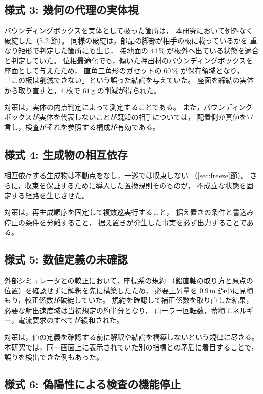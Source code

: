 \documentclass[a4paper,10pt,twocolumn]{ltjsarticle}
\begin{document}
\subsection{様式 3: 幾何の代理の実体視}

バウンディングボックスを実体として扱った箇所は，
本研究において例外なく破綻した（5.2 節）。
同様の破綻は，部品の脚部が相手の板に載っているかを
重なり矩形で判定した箇所にも生じ，
接地面の $44\,\%$ が板外へ出ている状態を適合と判定していた。
位相最適化でも，傾いた押出材のバウンディングボックスを座面として与えたため，
直角三角形のガセットの $60\,\%$ が保存領域となり，
「この板は削減できない」という誤った結論を与えていた。
座面を締結の実体から取り直すと，4 枚で $61\,$g の削減が得られた。

対策は，実体の内点判定によって測定することである。
また，バウンディングボックスが実体を代表しないことが既知の相手については，
配置側が真値を宣言し，検査がそれを参照する構成が有効である。

\subsection{様式 4: 生成物の相互依存}

相互依存する生成物は不動点をなし，一巡では収束しない
（\ref{sec:freeze}節）。
さらに，収束を保証するために導入した置換規則そのものが，
不成立な状態を固定する経路を生じさせた。

対策は，再生成順序を固定して複数巡実行すること，
据え置きの条件と書込み停止の条件を分離すること，
据え置きが発生した事実を必ず出力することである。

\subsection{様式 5: 数値定義の未確認}

外部シミュレータとの較正において，座標系の規約
（鉛直軸の取り方と原点の位置）を確認せずに解釈を先に構築したため，
必要上昇量を $0.9\,$m 過小に見積もり，較正係数が破綻していた。
規約を確認して補正係数を取り直した結果，
必要な射出速度域は当初想定の約半分となり，
ローラー回転数，蓄積エネルギー，電流要求のすべてが緩和された。

対策は，値の定義を確認する前に解釈や結論を構築しないという規律に尽きる。
本研究では，同一画面上に表示されていた別の指標との矛盾に着目することで，
誤りを検出できた例もあった。

\subsection{様式 6: 偽陽性による検査の機能停止}
\end{document}
